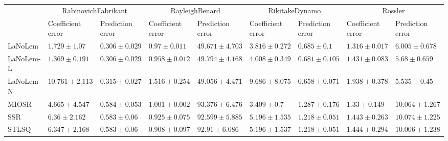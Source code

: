 \begin{table*}
{\begin{tabular}{lllllllll}
 & \multicolumn{2}{c}{RabinovichFabrikant} & \multicolumn{2}{c}{RayleighBenard} & \multicolumn{2}{c}{RikitakeDynamo} & \multicolumn{2}{c}{Rossler} \\
 & Coefficient error & Prediction error & Coefficient error & Prediction error & Coefficient error & Prediction error & Coefficient error & Prediction error \\
\midrule
LaNoLem & $1.729\pm 1.07$ & $\mathbf{0.306}\pm 0.029$ & $0.97\pm 0.011$ & $49.671\pm 4.703$ & $3.816\pm 0.272$ & $0.685\pm 0.1$ & $\mathbf{1.316}\pm 0.017$ & $6.005\pm 0.678$ \\
LaNoLem-L & $\mathbf{1.369}\pm 0.191$ & $0.306\pm 0.029$ & $0.958\pm 0.012$ & $49.794\pm 4.168$ & $4.008\pm 0.349$ & $0.681\pm 0.105$ & $1.431\pm 0.083$ & $5.68\pm 0.659$ \\
LaNoLem-N & $10.761\pm 2.113$ & $0.315\pm 0.027$ & $1.516\pm 0.254$ & $\mathbf{49.056}\pm 4.471$ & $9.686\pm 8.075$ & $\mathbf{0.658}\pm 0.071$ & $1.938\pm 0.378$ & $\mathbf{5.535}\pm 0.45$ \\
MIOSR & $4.665\pm 4.547$ & $0.584\pm 0.053$ & $1.001\pm 0.002$ & $93.376\pm 6.476$ & $\mathbf{3.409}\pm 0.7$ & $1.287\pm 0.176$ & $1.33\pm 0.149$ & $10.064\pm 1.267$ \\
SSR & $6.36\pm 2.162$ & $0.583\pm 0.06$ & $0.925\pm 0.075$ & $92.599\pm 5.885$ & $5.196\pm 1.535$ & $1.218\pm 0.051$ & $1.443\pm 0.263$ & $10.074\pm 1.225$ \\
STLSQ & $6.347\pm 2.168$ & $0.583\pm 0.06$ & $\mathbf{0.908}\pm 0.097$ & $92.91\pm 6.086$ & $5.196\pm 1.537$ & $1.218\pm 0.051$ & $1.444\pm 0.294$ & $10.006\pm 1.238$ \\

\midrule


\end{tabular}}
\end{table*}

